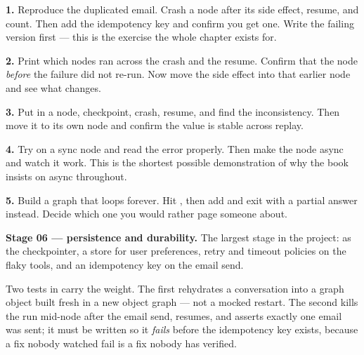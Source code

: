 \begin{exercisebox}
\textbf{1.} Reproduce the duplicated email. Crash a node after its side effect,
resume, and count. Then add the idempotency key and confirm you get one. Write
the failing version first --- this is the exercise the whole chapter exists for.

\textbf{2.} Print which nodes ran across the crash and the resume. Confirm that
the node \emph{before} the failure did not re-run. Now move the side effect into
that earlier node and see what changes.

\textbf{3.} Put  in a node, checkpoint, crash, resume, and
find the inconsistency. Then move it to its own node and confirm the value is
stable across replay.

\textbf{4.} Try  on a sync node and read the error properly. Then
make the node async and watch it work. This is the shortest possible
demonstration of why the book insists on async throughout.

\textbf{5.} Build a graph that loops forever. Hit , then
add  and exit with a partial answer instead. Decide which one
you would rather page someone about.
\end{exercisebox}

\begin{projectbox}
\textbf{Stage 06 --- persistence and durability.} The largest stage in the
project:  as the checkpointer, a store for user
preferences, retry and timeout policies on the flaky tools, and an idempotency
key on the email send.

Two tests in  carry the weight. The first
rehydrates a conversation into a graph object built fresh in a new object graph
--- not a mocked restart. The second kills the run mid-node after the email
send, resumes, and asserts exactly one email was sent; it must be written so it
\emph{fails} before the idempotency key exists, because a fix nobody watched fail
is a fix nobody has verified.
\end{projectbox}
